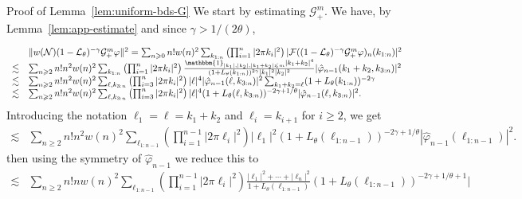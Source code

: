 \documentclass{article}
\newenvironment{proof*}[1]{\noindent\textbf{#1\ }}{\hspace*{\fill}$\Box$\medskip}
\begin{document}
\begin{proof*}{Proof of Lemma~\ref{lem:uniform-bds-G}}
  We start by estimating $\mathcal{G}_+^m$. We have, by
  Lemma~\ref{lem:app-estimate} and since $\gamma > 1 / (2 \theta)$,
  
  
  \[ \begin{array}{ll}
       & \| w (\mathcal{N}) (1 -\mathcal{L}_{\theta})^{- \gamma}
       \mathcal{G}_+^m \varphi \|^2 = \sum_{n \geqslant 0} n! w (n)^2
       \sum_{k_{1 : n}} \left( \prod_{i = 1}^n | 2 \pi k_i |^2 \right) |
       \mathcal{F} ((1 -\mathcal{L}_{\theta})^{- \gamma} \mathcal{G}_+^m
       \varphi)_n (k_{1 : n}) |^2\\
       \lesssim & \sum_{n \geqslant 2} n! n^2 w (n)^2 \sum_{k_{1 : n}} \left(
       \prod_{i = 1}^n | 2 \pi k_i |^2 \right) \frac{\mathbbm{1}_{| k_1 |, |
       k_2 |, | k_1 + k_2 | \leqslant m} | k_1 + k_2 |^4}{(1 + L_{\theta}
       (k_{1 : n}))^{2 \gamma} | k_1 |^2 | k_2 |^2} | \hat{\varphi}_{n - 1}
       (k_1 + k_2, k_{3 : n}) |^2\\
       \lesssim & \sum_{n \geqslant 2} n! n^2 w (n)^2 \sum_{\ell, k_{3 : n}}
       \left( \prod_{i = 3}^n | 2 \pi k_i |^2 \right) | \ell |^4 |
       \hat{\varphi}_{n - 1} (\ell, k_{3 : n}) |^2 \sum_{k_1 + k_2 = \ell} (1
       + L_{\theta} (k_{1 : n}))^{- 2 \gamma}\\
       \lesssim & \sum_{n \geqslant 2} n! n^2 w (n)^2 \sum_{\ell, k_{3 : n}}
       \left( \prod_{i = 3}^n | 2 \pi k_i |^2 \right) | \ell |^4 (1 +
       L_{\theta} (\ell, k_{3 : n}))^{- 2 \gamma + 1 / \theta} |
       \hat{\varphi}_{n - 1} (\ell, k_{3 : n}) |^2 .
     \end{array} \]
  Introducing the notation $\ell_1 = \ell = k_1 + k_2$ and $\ell_i = k_{i +
  1}$ for $i \geqslant 2$, we get
  \[ \begin{array}{ll}
       \lesssim & \sum_{n \geqslant 2} n! n^2 w (n)^2 \sum_{\ell_{1 : n - 1}}
       \left( \prod_{i = 1}^{n - 1} | 2 \pi \ell_i |^2 \right) | \ell_1 |^2 (1
       + L_{\theta} (\ell_{1 : n - 1}))^{- 2 \gamma + 1 / \theta} |
       \hat{\varphi}_{n - 1} (\ell_{1 : n - 1}) |^2 .
     \end{array} \]
  then using the symmetry of $\hat{\varphi}_{n - 1}$ we reduce this to
  \[ \begin{array}{ll}
       \lesssim & \sum_{n \geqslant 2} n! n w (n)^2 \sum_{\ell_{1 : n - 1}}
       \left( \prod_{i = 1}^{n - 1} | 2 \pi \ell_i |^2 \right) \frac{| \ell_1
       |^2 + \cdots + | \ell_n |^2}{1 + L_{\theta} (\ell_{1 : n - 1})} (1 +
       L_{\theta} (\ell_{1 : n - 1}))^{- 2 \gamma + 1 / \theta + 1} |

\end{array}\]
\end{proof*}
\end{document}
